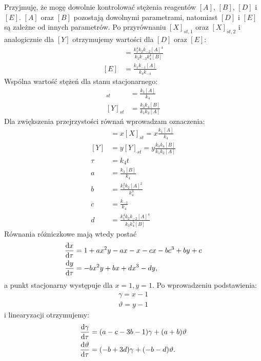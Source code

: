 \documentclass[10pt, a4paper, twoside, onecolumn]{article}
\numberwithin{equation}{section}
\begin{document}
	Przyjmuję, że mogę dowolnie kontrolować stężenia reagentów \([A]\), \([B]\), \([D]\) i \([E]\). \([A]\) oraz \([B]\) pozostają dowolnymi parametrami, natomiast \([D]\) i \([E]\) są zależne od innych parametrów. Po przyrównaniu \([X]_{st, 1}\) oraz \([X]_{st, 2}\) i analogicznie dla \([Y]\) otrzymujemy wartości dla \([D]\) oraz \([E]\):
	\begin{align}
		[D] &= \frac{k_{1}^{4}k_{2}k_{-2}[A]^{4}}{k_{3}k_{-3}k_{4}^{4}[B]} \\
		[E] &= \frac{k_{1}k_{-1}[A]}{k_{4}k_{-4}}
	\end{align}
	Wspólna wartość stężeń dla stanu stacjonarnego:
	\begin{align}
		[X]_{st} &= \frac{k_{1}[A]}{k_{4}} \\
		[Y]_{st} &= \frac{k_{3}k_{4}[B]}{k_{1}k_{2}[A]}
	\end{align}
	Dla zwiększenia przejrzystości równań wprowadzam oznaczenia: 
	\begin{align}
		[X] &= x[X]_{st} = x\frac{k_{1}[A]}{k_{4}} \\
		[Y] &= y[Y]_{st} = y\frac{k_{3}k_{4}[B]}{k_{1}k_{2}[A]} \\
		\tau &= k_{4}t \\
		a &= \frac{k_{3}[B]}{k_{4}} \\
		b &= \frac{k_{1}^{2}k_{2}[A]^{2}}{k_{4}^{3}} \\
		c &= \frac{k_{-1}}{k_{4}} \\
		d &= \frac{k_{1}^{4}k_{2}k_{-2}[A]^{4}}{k_{3}k_{4}^{5}[B]}
	\end{align}
	Równania różniczkowe mają wtedy postać
	\begin{equation}
	\begin{split}
		\dv{x}{\tau} &= 1 + ax^{2}y - ax - x - cx - bc^{3} + by + c \\
		\dv{y}{\tau} &= -bx^{2}y + bx + dx^{3} - dy, 
	\end{split}
	\end{equation}
	a punkt stacjonarny występuje dla \(x=1, y=1\). 
	Po wprowadzeniu podstawienia:
	\begin{gather*}
		\gamma = x - 1 \\
		\vartheta = y - 1
	\end{gather*}
	i linearyzacji otrzymujemy:
	\begin{equation}\label{brus_rev_lin}
	\begin{split}
		\dv{\gamma}{\tau} &= (a - c - 3b - 1)\gamma + (a + b)\vartheta \\
		\dv{\vartheta}{\tau} &= (- b + 3d)\gamma + (- b - d)\vartheta.
	\end{split}
	\end{equation}
\end{document}
